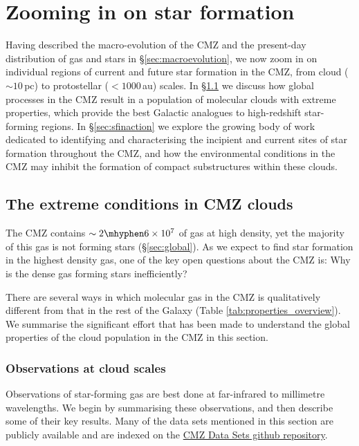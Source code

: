 \section{Zooming in on star formation} 
\label{sec:cloudtodisc}

Having described the macro-evolution of the CMZ and the present-day distribution of gas and stars in \S\ref{sec:macroevolution}, we now  zoom in on individual regions of current and future star formation in the CMZ, from cloud ($\sim10$\,pc) to protostellar ($<1000$\,au) scales. In \S \ref{sec:extremeclouds} we discuss how global processes in the CMZ result in a population of molecular clouds with extreme properties, which provide the best Galactic analogues to high-redshift star-forming regions. In \S \ref{sec:sfinaction} we explore the growing body of work dedicated to identifying and characterising the incipient and current sites of star formation throughout the CMZ, and how the environmental conditions in the CMZ may inhibit the formation of compact substructures within these clouds.

\subsection{The extreme conditions in CMZ clouds}
\label{sec:extremeclouds}
The CMZ contains $\sim2\mhyphen6\times10^{7}$ \msun of gas at high density, yet the majority of this gas is not forming stars (\S\ref{sec:global}).  
As we expect to find star formation in the highest density gas, one of the key open questions about the CMZ is: Why is the dense gas forming stars inefficiently?

There are several ways in which molecular gas in the CMZ is qualitatively different from that in the rest of the Galaxy (Table \ref{tab:properties_overview}).
We summarise the significant effort that has been made to understand the global properties of the cloud population in the CMZ in this section.

\subsubsection{Observations at cloud scales}

Observations of star-forming gas are best done at far-infrared to millimetre wavelengths.
We begin by summarising these observations, and then describe some of their key results.
Many of the data sets mentioned in this section are publicly available and are indexed on the \href{https://github.com/CentralMolecularZone/DataSets}{CMZ Data Sets github repository}.

